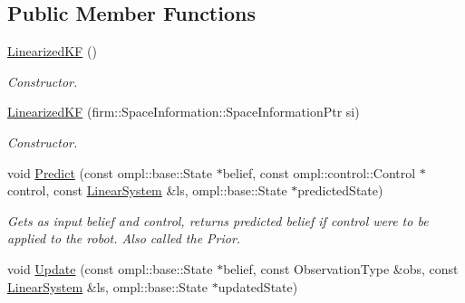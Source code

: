 \subsection*{\-Public \-Member \-Functions}
\begin{DoxyCompactItemize}
\item 
\hypertarget{class_linearized_k_f_a65e7448c5edd6d4130ce7bd1ec6e0cc5}{\hyperlink{class_linearized_k_f_a65e7448c5edd6d4130ce7bd1ec6e0cc5}{\-Linearized\-K\-F} ()}\label{class_linearized_k_f_a65e7448c5edd6d4130ce7bd1ec6e0cc5}

\begin{DoxyCompactList}\small\item\em \-Constructor. \end{DoxyCompactList}\item 
\hypertarget{class_linearized_k_f_af38864b2bbb3759c48011f152541ac93}{\hyperlink{class_linearized_k_f_af38864b2bbb3759c48011f152541ac93}{\-Linearized\-K\-F} (firm\-::\-Space\-Information\-::\-Space\-Information\-Ptr si)}\label{class_linearized_k_f_af38864b2bbb3759c48011f152541ac93}

\begin{DoxyCompactList}\small\item\em \-Constructor. \end{DoxyCompactList}\item 
\hypertarget{class_linearized_k_f_a62bda6a7234592bad9e227d45788cf51}{void \hyperlink{class_linearized_k_f_a62bda6a7234592bad9e227d45788cf51}{\-Predict} (const ompl\-::base\-::\-State $\ast$belief, const ompl\-::control\-::\-Control $\ast$control, const \hyperlink{class_linear_system}{\-Linear\-System} \&ls, ompl\-::base\-::\-State $\ast$predicted\-State)}\label{class_linearized_k_f_a62bda6a7234592bad9e227d45788cf51}

\begin{DoxyCompactList}\small\item\em \-Gets as input belief and control, returns predicted belief if control were to be applied to the robot. \-Also called the \-Prior. \end{DoxyCompactList}\item 
\hypertarget{class_linearized_k_f_abb67e01d9e14a67de60aaa6cdde56552}{void \hyperlink{class_linearized_k_f_abb67e01d9e14a67de60aaa6cdde56552}{\-Update} (const ompl\-::base\-::\-State $\ast$belief, const \-Observation\-Type \&obs, const \hyperlink{class_linear_system}{\-Linear\-System} \&ls, ompl\-::base\-::\-State $\ast$updated\-State)}\label{class_linearized_k_f_abb67e01d9e14a67de60aaa6cdde56552}


\end{DoxyCompactItemize}
